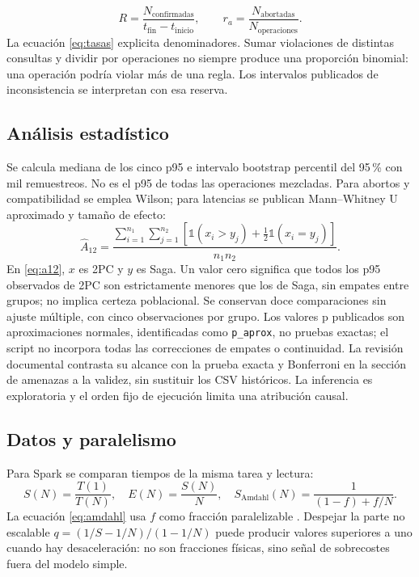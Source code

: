 \documentclass[12pt,a4paper]{article}
\begin{document}
\begin{equation}
R=\frac{N_{\mathrm{confirmadas}}}{t_{\mathrm{fin}}-t_{\mathrm{inicio}}},\qquad
r_a=\frac{N_{\mathrm{abortadas}}}{N_{\mathrm{operaciones}}}.
\label{eq:tasas}
\end{equation}
La ecuación \ref{eq:tasas} explicita denominadores. Sumar violaciones de distintas consultas y dividir por operaciones no siempre produce una proporción binomial: una operación podría violar más de una regla. Los intervalos publicados de inconsistencia se interpretan con esa reserva.

\subsection{Análisis estadístico}
Se calcula mediana de los cinco p95 e intervalo bootstrap percentil del 95\,\% con mil remuestreos. No es el p95 de todas las operaciones mezcladas. Para abortos y compatibilidad se emplea Wilson; para latencias se publican Mann--Whitney U aproximado y tamaño de efecto:
\begin{equation}
\widehat A_{12}=
\frac{\sum_{i=1}^{n_1}\sum_{j=1}^{n_2}
[\mathbb{1}(x_i>y_j)+\tfrac12\mathbb{1}(x_i=y_j)]}{n_1n_2}.
\label{eq:a12}
\end{equation}
En \ref{eq:a12}, \(x\) es 2PC y \(y\) es Saga. Un valor cero significa que todos los p95 observados de 2PC son estrictamente menores que los de Saga, sin empates entre grupos; no implica certeza poblacional. Se conservan doce comparaciones sin ajuste múltiple, con cinco observaciones por grupo. Los valores p publicados son aproximaciones normales, identificadas como \texttt{p\_aprox}, no pruebas exactas; el script no incorpora todas las correcciones de empates o continuidad. La revisión documental contrasta su alcance con la prueba exacta y Bonferroni en la sección de amenazas a la validez, sin sustituir los CSV históricos. La inferencia es exploratoria y el orden fijo de ejecución limita una atribución causal.

\subsection{Datos y paralelismo}
Para Spark se comparan tiempos de la misma tarea y lectura:
\begin{equation}
S(N)=\frac{T(1)}{T(N)},\quad E(N)=\frac{S(N)}{N},\quad
S_{\mathrm{Amdahl}}(N)=\frac{1}{(1-f)+f/N}.
\label{eq:amdahl}
\end{equation}
La ecuación \ref{eq:amdahl} usa \(f\) como fracción paralelizable \cite{amdahl1967validity}. Despejar la parte no escalable \(q=(1/S-1/N)/(1-1/N)\) puede producir valores superiores a uno cuando hay desaceleración: no son fracciones físicas, sino señal de sobrecostes fuera del modelo simple.
\end{document}
